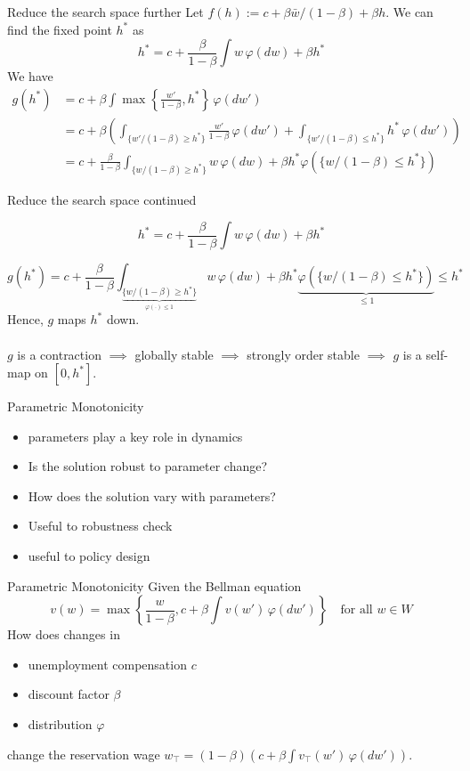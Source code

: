\begin{frame}{Reduce the search space further}
    Let $f(h):= c+\beta\bar w/(1-\beta) + \beta h$. We can find the fixed point $h^*$ as
    $$
    h^* = c + \frac{\beta}{1-\beta}\int w\,\varphi(dw) + \beta h^*
    $$
    We have 
    \begin{align*}
        g(h^*) & = c+ \beta \int \max\left\{\frac{w'}{1-\beta}, h^*\right\}\,\varphi(dw')\\
        &= c+ \beta\left(\int_{\{w'/(1-\beta)\ge h^*\}}\frac{w'}{1-\beta}\, \varphi(dw') + \int_{\{w'/(1-\beta)\le h^*\}}h^*\, \varphi(dw')\right)\\
        &= c + \frac{\beta}{1-\beta}\int_{\{w/(1-\beta)\ge h^*\}}w\,\varphi(dw) + \beta h^*\varphi(\{w/(1-\beta)\le h^*\})
    \end{align*}
\end{frame}

\begin{frame}{Reduce the search space continued}

$$
 h^* = c + \frac{\beta}{1-\beta}\int w\,\varphi(dw) + \beta h^*
$$

$$
 g(h^*) =c + \frac{\beta}{1-\beta}\int_{\underbrace{\{w/(1-\beta)\ge h^*\}}_{\varphi(\cdot)\le1}}w\,\varphi(dw) + \beta h^*\underbrace{\varphi(\{w/(1-\beta)\le h^*\})}_{\le1}\le h^*
$$
Hence, $g$ maps $h^*$ down.\\
\\
$g$ is a contraction $\implies$ globally stable $\implies$ strongly order stable $\implies$ $g$ is a self-map on $[0, h^*]$.
\end{frame}

\begin{frame}{Parametric Monotonicity}
    \begin{itemize}
        \item parameters play a key role in dynamics
        \item Is the solution robust to parameter change?
        \item  How does the solution vary with parameters?
        \item Useful to robustness check
        \item useful to policy design
    \end{itemize}
\end{frame}

\begin{frame}{Parametric Monotonicity}
        Given the Bellman equation
    $$
    v(w)  = \max\left\{\frac{w}{1-\beta}, c+\beta\int v(w') \,\varphi(dw')\right\}\quad\text{for all $w\in W$}
    $$
    How does changes in 
    \begin{itemize}
        \item unemployment compensation $c$
        \item discount factor $\beta$
        \item distribution $\varphi$
    \end{itemize}
    change the reservation wage $w_\top = (1-\beta) (c+\beta\int v_\top(w')\, \varphi(dw'))$.
\end{frame}

